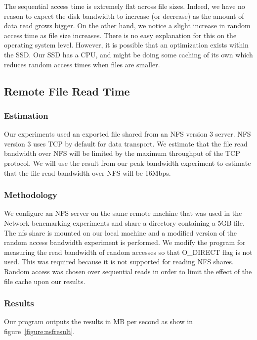The sequential access time is extremely flat across file sizes. Indeed, we have no reason to expect the disk bandwidth to increase (or decrease) as the amount of data read grows bigger. On the other hand, we notice a slight increase in random access time as file size increases. There is no easy explanation for this on the operating system level. However, it is possible that an optimization exists within the SSD. Our SSD has a CPU, and might be doing some caching of its own which reduces random access times when files are smaller.

\subsection{Remote File Read Time}

\subsubsection{Estimation}

Our experiments used an exported file shared from an NFS version 3 server. NFS
version 3 uses TCP by default for data transport.  We estimate that the file
read bandwidth over NFS will be limited by the maximum throughput of the TCP
protocol. We will use the result from our peak bandwidth experiment to estimate 
that the file read bandwidth over NFS will be 16Mbps.

\subsubsection{Methodology}

We configure an NFS server on the same remote machine that was used in the Network bencmarking experiments and share a directory containing a 5GB file. The nfs share is mounted on our local machine and a 
modified version of the random access bandwidth experiment is performed. We modify the program for measuring the read bandwidth of random accesses so that O\_DIRECT flag is not used. This was required because 
it is not supported for reading NFS shares. Random access was chosen over sequential reads in order to limit the effect of the file cache upon our results.

\subsubsection{Results}

Our program outputs the results in MB per second as show in figure~\ref{figure:nsfresult}.

